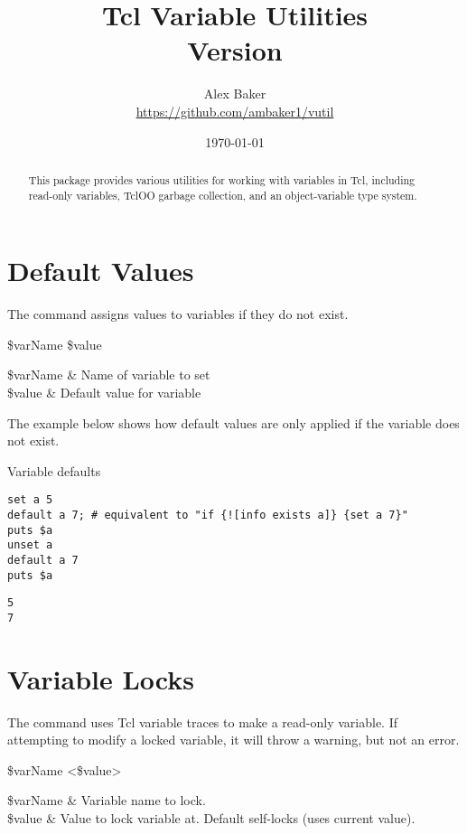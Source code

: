\documentclass{article}
\title{\Huge Tcl Variable Utilities\\\small Version \version}
\author{Alex Baker\\\small\url{https://github.com/ambaker1/vutil}}
\date{\small\today}
\begin{document}
\maketitle
\begin{abstract}
\begin{center}
This package provides various utilities for working with variables in Tcl, including read-only variables, TclOO garbage collection, and an object-variable type system.
\end{center}
\end{abstract}

\clearpage
\section{Default Values}
The command  assigns values to variables if they do not exist.
\begin{syntax}
 \$varName \$value
\end{syntax}
\begin{args}
\$varName & Name of variable to set \\
\$value & Default value for variable
\end{args}

The example below shows how default values are only applied if the variable does not exist.
\begin{example}{Variable defaults}
\begin{lstlisting}
set a 5
default a 7; # equivalent to "if {![info exists a]} {set a 7}"
puts $a
unset a
default a 7
puts $a
\end{lstlisting}
\tcblower
\begin{lstlisting}
5
7
\end{lstlisting}
\end{example}
\clearpage
\section{Variable Locks}
The command  uses Tcl variable traces to make a read-only variable. 
If attempting to modify a locked variable, it will throw a warning, but not an error.

\begin{syntax}
 \$varName <\$value>
\end{syntax}
\begin{args}
\$varName & Variable name to lock.  \\
\$value & Value to lock variable at. Default self-locks (uses current value).
\end{args}
\end{document}
